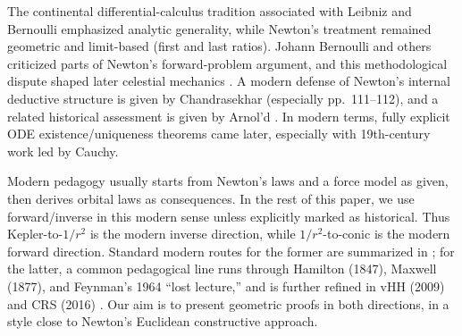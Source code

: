 The continental differential-calculus tradition associated with Leibniz and Bernoulli emphasized analytic generality, while Newton's treatment remained geometric and limit-based (first and last ratios). Johann Bernoulli and others criticized parts of Newton's forward-problem argument, and this methodological dispute shaped later celestial mechanics \cite{guicciardini1999reading}. A modern defense of Newton's internal deductive structure is given by Chandrasekhar (especially pp.~111--112), and a related historical assessment is given by Arnol'd \cite{chandrasekhar1995principia,arnold1990huygens}. In modern terms, fully explicit ODE existence/uniqueness theorems came later, especially with 19th-century work led by Cauchy.

Modern pedagogy usually starts from Newton's laws and a force model as given, then derives orbital laws as consequences. In the rest of this paper, we use forward/inverse in this modern sense unless explicitly marked as historical. Thus Kepler-to-$1/r^2$ is the modern inverse direction, while $1/r^2$-to-conic is the modern forward direction. Standard modern routes for the former are summarized in \cite{chandrasekhar1995principia,ostermannwanner2012geometry,markowsky2011newton}; for the latter, a common pedagogical line runs through Hamilton (1847), Maxwell (1877), and Feynman's 1964 ``lost lecture,'' and is further refined in vHH (2009) and CRS (2016) \cite{hamilton1847hodograph,maxwell1877mattermotion,goodstein1996feynman,vanhaandelheckman2009teaching,carinena2016newlook}. Our aim is to present geometric proofs in both directions, in a style close to Newton's Euclidean constructive approach.

